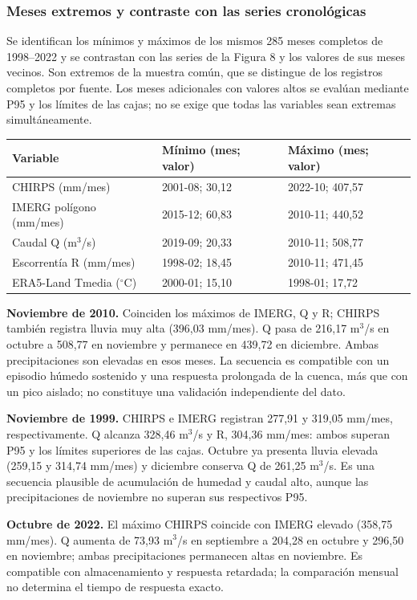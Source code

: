 \subsubsection*{Meses extremos y contraste con las series cronológicas}
Se identifican los mínimos y máximos de los mismos 285 meses completos de 1998--2022 y se contrastan con las series de la Figura 8 y los valores de sus meses vecinos. Son extremos de la muestra común, que se distingue de los registros completos por fuente. Los meses adicionales con valores altos se evalúan mediante P95 y los límites de las cajas; no se exige que todas las variables sean extremas simultáneamente.

\begin{center}
{\small
\begin{tabular}{lll}
\toprule
Variable & Mínimo (mes; valor) & Máximo (mes; valor) \\
\midrule
CHIRPS (mm/mes) & 2001-08; 30,12 & 2022-10; 407,57 \\
IMERG polígono (mm/mes) & 2015-12; 60,83 & 2010-11; 440,52 \\
Caudal Q (m$^3$/s) & 2019-09; 20,33 & 2010-11; 508,77 \\
Escorrentía R (mm/mes) & 1998-02; 18,45 & 2010-11; 471,45 \\
ERA5-Land Tmedia ($^\circ$C) & 2000-01; 15,10 & 1998-01; 17,72 \\
\bottomrule
\end{tabular}
}
\end{center}

\textbf{Noviembre de 2010.} Coinciden los máximos de IMERG, Q y R; CHIRPS también registra lluvia muy alta (396,03 mm/mes). Q pasa de 216,17 m$^3$/s en octubre a 508,77 en noviembre y permanece en 439,72 en diciembre. Ambas precipitaciones son elevadas en esos meses. La secuencia es compatible con un episodio húmedo sostenido y una respuesta prolongada de la cuenca, más que con un pico aislado; no constituye una validación independiente del dato.

\textbf{Noviembre de 1999.} CHIRPS e IMERG registran 277,91 y 319,05 mm/mes, respectivamente. Q alcanza 328,46 m$^3$/s y R, 304,36 mm/mes: ambos superan P95 y los límites superiores de las cajas. Octubre ya presenta lluvia elevada (259,15 y 314,74 mm/mes) y diciembre conserva Q de 261,25 m$^3$/s. Es una secuencia plausible de acumulación de humedad y caudal alto, aunque las precipitaciones de noviembre no superan sus respectivos P95.

\textbf{Octubre de 2022.} El máximo CHIRPS coincide con IMERG elevado (358,75 mm/mes). Q aumenta de 73,93 m$^3$/s en septiembre a 204,28 en octubre y 296,50 en noviembre; ambas precipitaciones permanecen altas en noviembre. Es compatible con almacenamiento y respuesta retardada; la comparación mensual no determina el tiempo de respuesta exacto.


